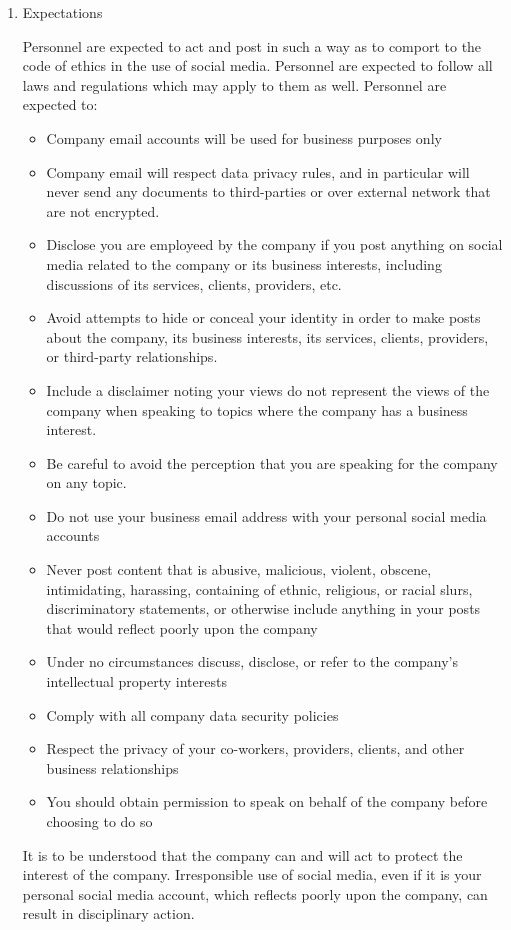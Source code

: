 \documentclass[stu]{apa7}
\begin{document}
\begin{enumerate}
\item Expectations
\label{sec:orgfce4fdd}

Personnel are expected to act and post in such a way as to comport to the code of ethics in the use of social media. Personnel are expected to follow all laws and regulations which may apply to them as well. Personnel are expected to:

\begin{itemize}
\item Company email accounts will be used for business purposes only
\item Company email will respect data privacy rules, and in particular will never send any documents to third-parties or over external network that are not encrypted.
\item Disclose you are employeed by the company if you post anything on social media related to the company or its business interests, including discussions of its services, clients, providers, etc.
\item Avoid attempts to hide or conceal your identity in order to make posts about the company, its business interests, its services, clients, providers, or third-party relationships.
\item Include a disclaimer noting your views do not represent the views of the company when speaking to topics where the company has a business interest.
\item Be careful to avoid the perception that you are speaking for the company on any topic.
\item Do not use your business email address with your personal social media accounts
\item Never post content that is abusive, malicious, violent, obscene, intimidating, harassing, containing of ethnic, religious, or racial slurs, discriminatory statements, or otherwise include anything in your posts that would reflect poorly upon the company
\item Under no circumstances discuss, disclose, or refer to the company's intellectual property interests
\item Comply with all company data security policies
\item Respect the privacy of your co-workers, providers, clients, and other business relationships
\item You should obtain permission to speak on behalf of the company before choosing to do so
\end{itemize}

It is to be understood that the company can and will act to protect the interest of the company. Irresponsible use of social media, even if it is your personal social media account, which reflects poorly upon the company, can result in disciplinary action.


\end{enumerate}
\end{document}
